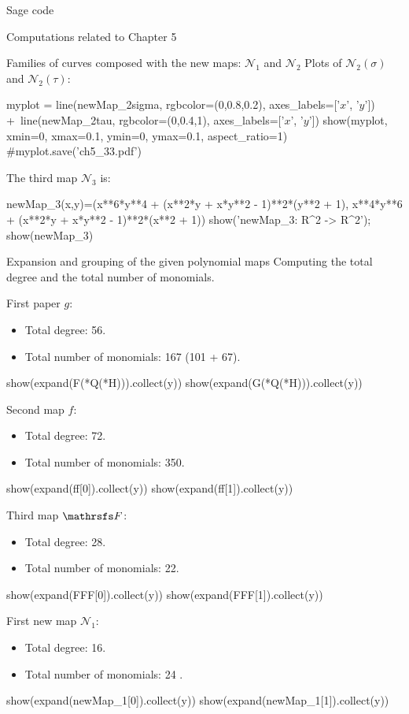 \documentclass[11pt, a4paper, english, twoside, notitlepage, openright]{report}
\begin{document}
\begin{chapter}{Sage code}
\begin{section}{Computations related to Chapter 5}
\begin{subsection}{Families of curves composed with the new maps: $\mathcal{N}_1$ and $\mathcal{N}_2$}
Plots of $\mathcal{N}_2(\sigma)$ and $\mathcal{N}_2(\tau)$:
\begin{sage}
myplot = line(newMap_2sigma, rgbcolor=(0,0.8,0.2), axes_labels=['$x$', '$y$']) +\
    line(newMap_2tau, rgbcolor=(0,0.4,1), axes_labels=['$x$', '$y$'])
show(myplot, xmin=0, xmax=0.1, ymin=0, ymax=0.1, aspect_ratio=1)
#myplot.save('ch5_33.pdf')
\end{sage}

The third map $\mathcal{N}_3$ is:
\begin{sage}
newMap_3(x,y)=(x**6*y**4 + (x**2*y + x*y**2 - 1)**2*(y**2 + 1), x**4*y**6 + (x**2*y + x*y**2 - 1)**2*(x**2 + 1))
show('newMap_3: R^2 -> R^2'); show(newMap_3)
\end{sage}
\end{subsection}

\begin{subsection}{Expansion and grouping of the given polynomial maps}
Computing the total degree and the total number of monomials.

First paper $g$:
\begin{itemize}
\item Total degree: 56.
\item Total number of monomials: 167 (101 + 67).
\end{itemize}
\begin{sage}
show(expand(F(*Q(*H))).collect(y))
show(expand(G(*Q(*H))).collect(y))
\end{sage}

Second map $f$:
\begin{itemize}
\item Total degree: 72.
\item Total number of monomials: 350.
\end{itemize}
\begin{sage}
show(expand(ff[0]).collect(y))
show(expand(ff[1]).collect(y))
\end{sage}

Third map $\FFF$:
\begin{itemize}
\item Total degree: 28.
\item Total number of monomials: 22. 
\end{itemize}
\begin{sage}
show(expand(FFF[0]).collect(y))
show(expand(FFF[1]).collect(y))
\end{sage}

First new map $\mathcal{N}_1$:
\begin{itemize}
\item Total degree: 16.
\item Total number of monomials: 24 .
\end{itemize}
\begin{sage}
show(expand(newMap_1[0]).collect(y))
show(expand(newMap_1[1]).collect(y))
\end{sage}


\end{subsection}
\end{section}
\end{chapter}
\end{document}

